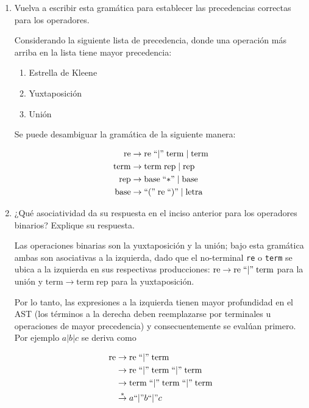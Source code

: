 \documentclass[a4paper, twoside, 12pt]{article}
\begin{document}
\begin{enumerate}
\begin{enumerate}
        
        \item Vuelva a escribir esta gramática para establecer las precedencias correctas para los operadores.

        Considerando la siguiente lista de precedencia, donde una operación más arriba en la lista tiene mayor precedencia:

        \begin{enumerate}
            \item Estrella de Kleene
            \item Yuxtaposición
            \item Unión
        \end{enumerate}

        Se puede desambiguar la gramática de la siguiente manera:

        \begin{align*}
            \mathrm{re} &\rightarrow \mathrm{re} \; ``|"  \; \mathrm{term} \; | \; \mathrm{term} \\
            \mathrm{term} &\rightarrow \mathrm{term} \; \mathrm{rep} \; | \; \mathrm{rep}\\
            \mathrm{rep} &\rightarrow \mathrm{base} \; ``\mathrm{*}" \; | \; \mathrm{base}\\
            \mathrm{base} &\rightarrow ``(" \; \mathrm{re} \; ``)" \; | \; \mathrm{letra}
        \end{align*}

        \item ¿Qué asociatividad da su respuesta en el inciso anterior para los operadores binarios? Explique su respuesta.

        Las operaciones binarias son la yuxtaposición y la unión; bajo esta gramática ambas son asociativas a la izquierda, dado que el no-terminal \texttt{re} o \texttt{term} se ubica a la izquierda en sus respectivas producciones: $\mathrm{re} \rightarrow \mathrm{re} \; ``|"  \; \mathrm{term}$ para la unión y $\mathrm{term} \rightarrow \mathrm{term} \; \mathrm{rep}$ para la yuxtaposición.
        
        Por lo tanto, las expresiones a la izquierda tienen mayor profundidad en el AST (los términos a la derecha deben reemplazarse por terminales u operaciones de mayor precedencia) y consecuentemente se evalúan primero. Por ejemplo $a|b|c$ se deriva como

        \begin{multicols}{2}
            
        \begin{align*}
            \mathrm{re} &\rightarrow \mathrm{re} \; ``|"  \; \mathrm{term} \\
                        &\rightarrow \mathrm{re} \; ``|"  \; \mathrm{term} \; ``|"  \; \mathrm{term} \\
                        &\rightarrow \mathrm{term} \; ``|"  \; \mathrm{term} \; ``|"  \; \mathrm{term} \\
                        &\overset{*}{\rightarrow} a ``|" b ``|" c
        \end{align*}


\end{multicols}
\end{enumerate}
\end{enumerate}
\end{document}

